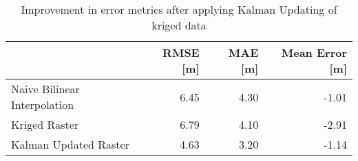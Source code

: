 \begin{table}
\centering
\caption{Improvement in error metrics after applying Kalman Updating of kriged data}
\label{tab:stcroix_gebco_raster_error}
\begin{tabular}{lrrr}
\toprule
 & RMSE [m] & MAE [m] & Mean Error [m] \\
\midrule
Naive Bilinear Interpolation & 6.45 & 4.30 & -1.01 \\
Kriged Raster & 6.79 & 4.10 & -2.91 \\
Kalman Updated Raster & 4.63 & 3.20 & -1.14 \\
\bottomrule
\end{tabular}
\end{table}
